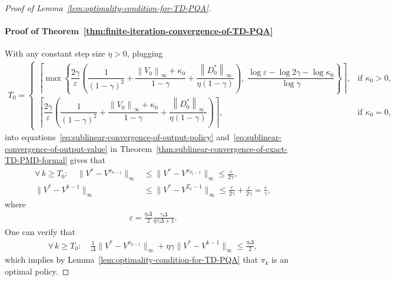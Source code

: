 \documentclass[10pt]{article}
\newcommand{\ls}{\left}
\newcommand{\rs}{\right}
\theoremstyle{plain}
\theoremstyle{definition}
\begin{document}
\begin{proof}[Proof of Lemma~\ref{lem:optimality-condition-for-TD-PQA}]
    \paragraph{Proof of Theorem~\ref{thm:finite-iteration-convergence-of-TD-PQA}} With any constant step size $\eta > 0$, plugging
    \begin{align*}
        T_0 \!=\! \begin{cases}
            \!\ls\lceil \max  \ls\{ \dfrac{2\gamma}{\varepsilon} \!\ls( \dfrac{1}{(1-\gamma)^2}\!+\!\dfrac{\ls\| V_0 \rs\|_\infty \!+\! \kappa_0}{1-\gamma} \!+\! \dfrac{\ls\| D_0^* \rs\|_\infty}{\eta(1-\gamma)} \rs)\!, \; \dfrac{\log\varepsilon \!-\! \log 2\gamma \!-\! \log \kappa_0}{\log \gamma} \rs\} \!\rs\rceil, & \!\mbox{if } \kappa_0 > 0, \\[.7em]
            \!\ls\lceil \dfrac{2\gamma}{\varepsilon} \ls( \dfrac{1}{(1-\gamma)^2}\!+\!\dfrac{\ls\| V_0 \rs\|_\infty \!+\! \kappa_0}{1-\gamma} + \dfrac{\ls\| D_0^* \rs\|_\infty}{\eta(1-\gamma)} \rs) \rs\rceil, & \!\mbox{if } \kappa_0 = 0,
        \end{cases}  
    \end{align*}
    into equations~\eqref{eq:sublinear-convergence-of-output-policy} and~\eqref{eq:sublinear-convergence-of-output-value} in Theorem~\ref{thm:sublinear-convergence-of-exact-TD-PMD-formal} gives that
    \begin{align*}
        \forall\, k\geq T_0: \quad  \| V^* - V^{\pi_{k-1}} \|_\infty &\leq  \| V^* - V^{\pi_{T_0-1}} \|_\infty \leq \frac{\varepsilon}{2\gamma},\\
        \| V^* - V^{k-1} \|_\infty &\leq \| V^* - V^{T_0-1} \|_\infty \leq \frac{\varepsilon}{2\gamma} + \frac{\varepsilon}{2\gamma} = \frac{\varepsilon}{\gamma},
    \end{align*}
    where
    \begin{align*}
        \varepsilon = \frac{\eta\Delta}{2} \frac{\gamma\Delta}{\eta\gamma\Delta + 1}.
    \end{align*}
    One can verify that
    \begin{align*}
        \forall\, k\geq T_0: \quad \frac{1}{\Delta} \| V^* - V^{\pi_{k-1}} \|_\infty + \eta\gamma \| V^* - V^{k-1} \|_\infty \leq \frac{\eta\Delta}{2},
    \end{align*}
    which implies by Lemma~\ref{lem:optimality-condition-for-TD-PQA} that $ \pi_k $ is an optimal policy.
\end{proof}
\end{document}
